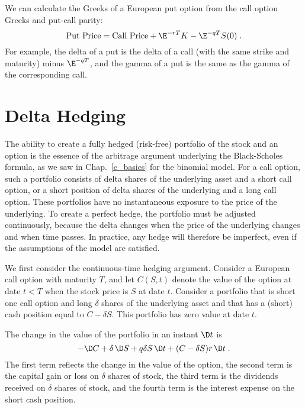 We can calculate the Greeks of a European put option from the call option Greeks and put-call parity:
$$\text{Put Price} = \text{Call Price} +\E^{-rT}K- \E^{-q T}S(0)\; .$$
For example, the delta of a put is the delta of a call (with the same strike and maturity) minus $\E^{-q T}$, and the gamma of a put is the same as the gamma of the corresponding call.

\section{Delta Hedging}\label{s_deltahedging}

The ability to create a fully hedged (risk-free) portfolio of the stock and an option is the essence of the arbitrage argument underlying the Black-Scholes formula, as we saw in Chap.~\ref{c_basics} for the binomial model.  For a call option, such a portfolio consists of delta shares of the underlying asset and a short call option, or a short position of delta shares of the underlying and a long call option.   These portfolios have no instantaneous exposure to the price of the underlying.  To create a perfect hedge, the portfolio must be adjusted continuously, because the delta changes when the price of the underlying changes and when time passes.  In practice, any hedge will therefore be imperfect, even if the assumptions of the model are satisfied. 

We first consider the continuous-time hedging argument.  Consider a European call option with maturity $T$, and let $C(S,t)$ denote the value of the option at date $t<T$ when the stock price is $S$ at date $t$.  Consider a portfolio that is short one call option and long $\delta$ shares of the underlying asset and that has a (short) cash position equal to $C-\delta S$.  This portfolio has zero value at date $t$.  

The change in the value of the portfolio in an instant $\D t$ is
\begin{equation}\label{changeportfoliovalue}
-\D C + \delta \,\D S + q \delta S\,\D t+(C-\delta S)r\,\D t\;.
\end{equation}
The first term reflects the change in the value of the option, the second term is the capital gain or loss on $\delta$ shares of stock, the third term is the dividends received on $\delta$ shares of stock, and the fourth term is the interest expense on the short cash position.


